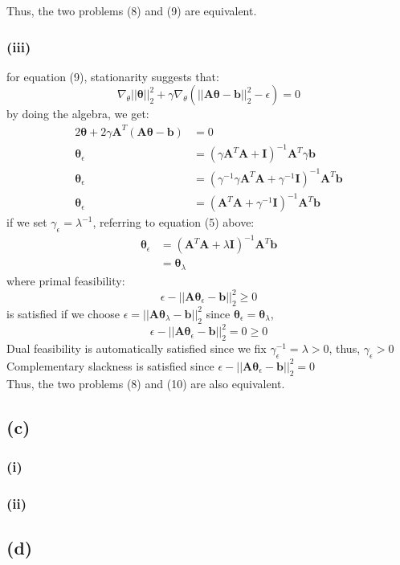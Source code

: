 \documentclass[11pt]{article}
\begin{document}
\noindent Thus, the two problems (8) and (9) are equivalent.
\subsubsection*{(iii)}
for equation (9), stationarity suggests that:
\begin{equation}
\nabla_\theta||\pmb{\theta}||^2_2+\gamma\nabla_\theta(||\pmb{A\theta}-\pmb{b}||^2_2-\epsilon)=0
\end{equation}
by doing the algebra, we get:
\begin{equation}
\begin{split}
2\pmb{\theta}+2\gamma\pmb{A}^T(\pmb{A\theta}-\pmb{b})&=0\\
\pmb{\theta}_\epsilon&=(\gamma\pmb{A}^T\pmb{A}+\pmb{I})^{-1}\pmb{A}^T\gamma\pmb{b}\\
\pmb{\theta}_\epsilon&=(\gamma^{-1}\gamma\pmb{A}^T\pmb{A}+\gamma^{-1}\pmb{I})^{-1}\pmb{A}^T\pmb{b}\\
\pmb{\theta}_\epsilon&=(\pmb{A}^T\pmb{A}+\gamma^{-1}\pmb{I})^{-1}\pmb{A}^T\pmb{b}
\end{split}
\end{equation}
if we set $\gamma_\epsilon=\lambda^{-1}$, referring to equation (5) above:\\
\begin{equation}
\begin{split}
\pmb{\theta}_\epsilon&=(\pmb{A}^T\pmb{A}+\lambda\pmb{I})^{-1}\pmb{A}^T\pmb{b}\\
&=\pmb{\theta}_\lambda
\end{split}
\end{equation}
where primal feasibility:
$$\epsilon-||\pmb{A\theta}_\epsilon-\pmb{b}||^2_2\ge 0$$
is satisfied if we choose $\epsilon = ||\pmb{A\theta}_\lambda-\pmb{b}||^2_2$ since $\pmb{\theta}_\epsilon = \pmb{\theta}_\lambda$,\\
$$\epsilon-||\pmb{A\theta}_\epsilon-\pmb{b}||^2_2=0\ge0$$
Dual feasibility is automatically satisfied since we fix $\gamma_\epsilon^{-1}=\lambda>0$, thus, $
\gamma_\epsilon > 0$\\
Complementary slackness is satisfied since 	$\epsilon-||\pmb{A\theta}_\epsilon-\pmb{b}||^2_2=0$\\

\noindent Thus, the two problems (8) and (10) are also equivalent.
\pagebreak
\subsection*{(c)}
\subsubsection*{(i)}
\begin{figure}[h]
	\centering
\end{figure}
\subsubsection*{(ii)}
\begin{figure}[h]
	\centering
\end{figure}
\subsection*{(d)}
\end{document}
